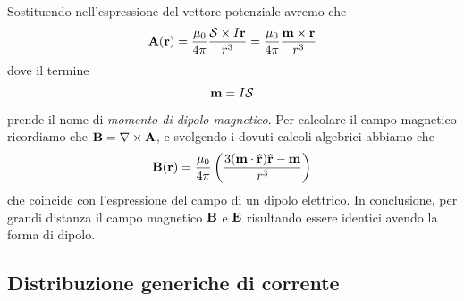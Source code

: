 Sostituendo nell'espressione del vettore potenziale avremo che 
\begin{equation*}
	\bold{A}(\bold{r}) = \frac{\mu_0}{4 \pi} \frac{\mathcal{S} \times I\bold{r}}{r^3} = \frac{\mu_0}{4 \pi} \frac{\bold{m}\times \bold{r}}{r^3}
\end{equation*}
dove il termine 
\begin{equation}
	\bold{m} = I \mathcal{S} 
\end{equation}
prende il nome di \textit{momento di dipolo magnetico}. Per calcolare il campo magnetico ricordiamo che $\bold{B} = \nabla \times \bold{A}$, e svolgendo i dovuti calcoli algebrici abbiamo che
\begin{equation*}
	\bold{B}(\bold{r}) = \frac{\mu_0}{4 \pi} \left ( \frac{3(\bold{m} \cdot \bold{\hat{r}})\bold{\hat{r}} - \bold{m}}{r^3}\right)
\end{equation*}
che coincide con l'espressione del campo di un dipolo elettrico. In conclusione, per grandi distanza il campo magnetico $\bold{B}$ e $\bold{E}$ risultando essere identici avendo la forma di dipolo.

\subsection{Distribuzione generiche di corrente}

